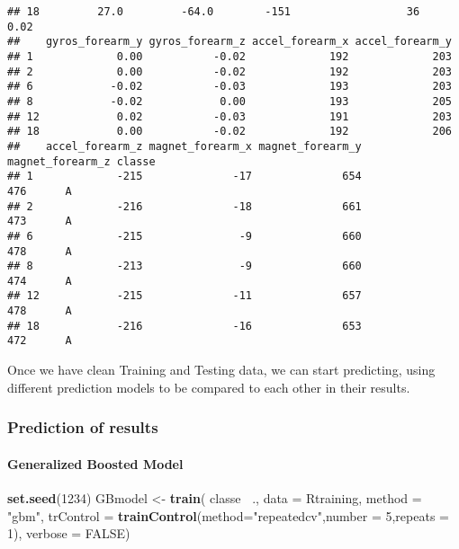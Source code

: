 \documentclass[]{article}
\newenvironment{Shaded}{\begin{snugshade}}{\end{snugshade}}
\newcommand{\DataTypeTok}[1]{\textcolor[rgb]{0.13,0.29,0.53}{#1}}
\newcommand{\DecValTok}[1]{\textcolor[rgb]{0.00,0.00,0.81}{#1}}
\newcommand{\KeywordTok}[1]{\textcolor[rgb]{0.13,0.29,0.53}{\textbf{#1}}}
\newcommand{\NormalTok}[1]{#1}
\newcommand{\OperatorTok}[1]{\textcolor[rgb]{0.81,0.36,0.00}{\textbf{#1}}}
\newcommand{\OtherTok}[1]{\textcolor[rgb]{0.56,0.35,0.01}{#1}}
\newcommand{\StringTok}[1]{\textcolor[rgb]{0.31,0.60,0.02}{#1}}
\let\oldparagraph\paragraph
\renewcommand{\paragraph}[1]{\oldparagraph{#1}\mbox{}}
\begin{document}
\begin{verbatim}
## 18         27.0         -64.0        -151                  36            0.02
##    gyros_forearm_y gyros_forearm_z accel_forearm_x accel_forearm_y
## 1             0.00           -0.02             192             203
## 2             0.00           -0.02             192             203
## 6            -0.02           -0.03             193             203
## 8            -0.02            0.00             193             205
## 12            0.02           -0.03             191             203
## 18            0.00           -0.02             192             206
##    accel_forearm_z magnet_forearm_x magnet_forearm_y magnet_forearm_z classe
## 1             -215              -17              654              476      A
## 2             -216              -18              661              473      A
## 6             -215               -9              660              478      A
## 8             -213               -9              660              474      A
## 12            -215              -11              657              478      A
## 18            -216              -16              653              472      A
\end{verbatim}

Once we have clean Training and Testing data, we can start predicting,
using different prediction models to be compared to each other in their
results.

\hypertarget{prediction-of-results}{%
\subsubsection{Prediction of results}\label{prediction-of-results}}

\hypertarget{generalized-boosted-model}{%
\paragraph{Generalized Boosted Model}\label{generalized-boosted-model}}

\begin{Shaded}
\begin{Highlighting}[]
\KeywordTok{set.seed}\NormalTok{(}\DecValTok{1234}\NormalTok{)}
\NormalTok{GBmodel <-}\StringTok{ }\KeywordTok{train}\NormalTok{( classe }\OperatorTok{~}\NormalTok{., }\DataTypeTok{data =}\NormalTok{ Rtraining, }\DataTypeTok{method =} \StringTok{"gbm"}\NormalTok{, }\DataTypeTok{trControl =} \KeywordTok{trainControl}\NormalTok{(}\DataTypeTok{method=}\StringTok{"repeatedcv"}\NormalTok{,}\DataTypeTok{number =} \DecValTok{5}\NormalTok{,}\DataTypeTok{repeats =} \DecValTok{1}\NormalTok{), }\DataTypeTok{verbose =} \OtherTok{FALSE}\NormalTok{)}
\end{Highlighting}
\end{Shaded}
\end{document}
